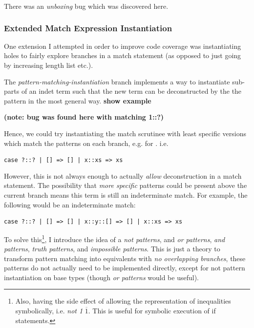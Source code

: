 There was an \textit{unboxing} bug which was discovered here.

\subsubsection{Extended Match Expression Instantiation}
One extension I attempted in order to improve code coverage was instantiating holes to fairly explore branches in a match statement (as opposed to just going by increasing length list etc.). 

The \textit{pattern-matching-instantiation} branch implements a way to instantiate sub-parts of an indet term such that the new term can be deconstructed by the the pattern in the most general way. \textbf{show example}

\textbf{(note: bug was found here with matching 1::?)}

Hence, we could try instantiating the match scrutinee with least specific versions which match the patterns on each branch, e.g.  for . i.e. 

\texttt{case ?::? | [] => [] | x::xs => xs}

However, this is not always enough to actually \textit{allow} deconstruction in a match statement. The possibility that \textit{more specific} patterns could be present above the current branch means this term is still an indeterminate match. For example, the following would be an indeterminate match:

\texttt{case ?::? | [] => [] | x::y::[] => [] | x::xs => xs}

To solve this\footnote{Also, having the side effect of allowing the representation of inequalities symbolically, i.e. \textit{not 1} $\overline{1}$. This is useful for symbolic execution of if statements.}, I introduce the idea of a \textit{not patterns}, and \textit{or patterns}, \textit{and patterns}, \textit{truth patterns}, and \textit{impossible patterns}. This is just a theory to transform pattern matching into equivalents with \textit{no overlapping branches}, these patterns do not actually need to be implemented directly, except for not pattern instantiation on base types (though \textit{or patterns} would be useful).

